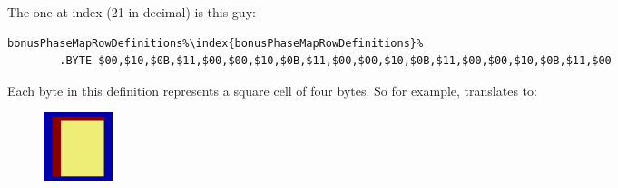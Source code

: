 The one at index  (21 in decimal) is this guy:

\begin{lstlisting}[basicstyle=\tiny,escapechar=\%]
bonusPhaseMapRowDefinitions%\index{bonusPhaseMapRowDefinitions}%   
        .BYTE $00,$10,$0B,$11,$00,$00,$10,$0B,$11,$00,$00,$10,$0B,$11,$00,$00,$10,$0B,$11,$00
\end{lstlisting}

Each byte in this definition represents a square cell of four bytes. So for example, 
translates to:

\begin{figure}[H]
  {
    \begin{adjustbox}{width=2cm,center}
        \includegraphics[width=2cm]{src/bonusphase/row21_cell0.png}%
    \end{adjustbox}
  }
\end{figure}

